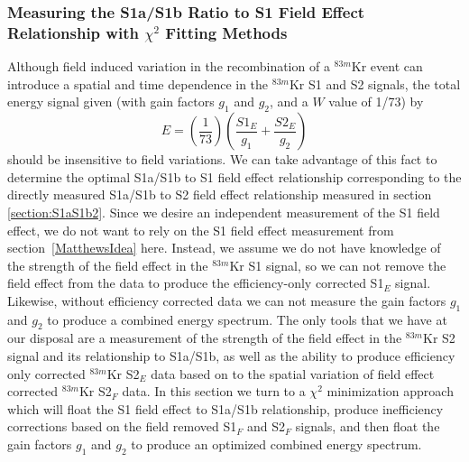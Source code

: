 \subsubsection{Measuring the S1a/S1b Ratio to S1 Field Effect Relationship with $\chi^2$ Fitting Methods} \label{section:S1relation2}

Although field induced variation in the recombination of a $^{83m}$Kr event can introduce a spatial and time dependence in the $^{83m}$Kr S1 and S2 signals, the total energy signal given (with gain factors $g_1$ and $g_2$, and a $W$ value of 1/73) by 
\begin{equation} \label{CombinedEnergy}
E=\left(\frac{1}{73}\right)\left(\frac{S1_E}{g_1} + \frac{S2_E}{g_2}\right)
\end{equation}
should be insensitive to field variations.  We can take advantage of this fact to determine the optimal S1a/S1b to S1 field effect relationship corresponding to the directly measured S1a/S1b to S2 field effect relationship measured in section \ref{section:S1aS1b2}.  Since we desire an independent measurement of the S1 field effect, we do not want to rely on the S1 field effect measurement from section~\ref{MatthewsIdea} here.  Instead, we assume we do not have knowledge of the strength of the field effect in the $^{83m}$Kr S1 signal, so we can not remove the field effect from the data to produce the efficiency-only corrected S1$_E$ signal.  Likewise, without efficiency corrected data we can not measure the gain factors $g_1$ and $g_2$ to produce a combined energy spectrum.  The only tools that we have at our disposal are a measurement of the strength of the field effect in the $^{83m}$Kr S2 signal and its relationship to S1a/S1b, as well as the ability to produce efficiency only corrected $^{83m}$Kr S2$_E$ data based on to the spatial variation of field effect corrected  $^{83m}$Kr S2$_F$ data.  In this section we turn to a $\chi^2$ minimization approach which will float the S1 field effect to S1a/S1b relationship, produce inefficiency corrections based on the field removed S1$_F$ and S2$_F$ signals, and then float the gain factors $g_1$ and $g_2$ to produce an optimized combined energy spectrum.  

